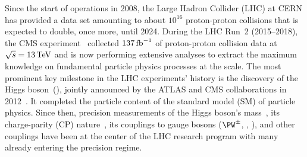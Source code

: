 \documentclass[a4paper,11pt]{article}
\newcommand{\Pb}{{{\Pqb}}\xspace}
\newcommand{\Pt}{{{\Pqt}}\xspace}
\newcommand{\Ps}{{{\Pqs}}\xspace}
\newcommand{\Pc}{{{\Pqc}}\xspace}
\newcommand{\Pd}{{{\Pqd}}\xspace}
\newcommand{\Pu}{{{\Pqu}}\xspace}
\begin{document}
Since the start of operations in 2008, the Large Hadron Collider (LHC) at CERN has provided a data set amounting to about $10^{16}$ proton-proton collisions that is expected to double, once more, until 2024.
During the LHC Run~2 (2015--2018), the CMS experiment~\cite{CMS_ex} collected  $137\mbox{\ensuremath{\,\text{fb}^{-1}}}$ of proton-proton collision data at $\sqrt{s}=13\,\text{Te\hspace{-.08em}V}$ and is now performing extensive analyses to extract the maximum knowledge on fundamental particle physics processes at the \TeV scale.
The most prominent key milestone in the LHC experiments' history is the discovery of the Higgs boson~(\PH), jointly announced by the ATLAS and CMS collaborations in 2012~\cite{Aad:2012tfa,Chatrchyan:2012ufa}.
It completed the particle content of the standard model (SM) of particle physics. 
Since then, precision measurements of the Higgs boson's mass~\cite{CMS:2017dib,CMS:2020xrn}, its charge-parity (CP) nature~\cite{CMS:2019jdw,CMS:2020cga}, its couplings to gauge bosons ($\PW^{\pm}$, \PZ, \Pgg), and other couplings have been at the center of the LHC research program with many already entering the precision regime.

\end{document}
